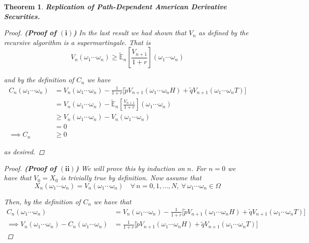 \documentclass[12pt]{article}
\newtheorem{theorem}{Theorem}
\newcommand{\E}{\mathbb E}
\begin{document}
\begin{theorem} {\bf Replication of Path-Dependent American Derivative Securities.}
\begin{proof} {\bf {\em (Proof of $\bm{(i)}$)}} In the last result we had shown that $V_n$ as defined by the recursive algorithm is a supermartingale. That is
\begin{equation*}
	V_n(\omega_1\cdots\omega_n) \geq \tilde{\E}_n \left[ \frac{V_{n + 1}}{1 + r}\right](\omega_1\cdots\omega_n)
\end{equation*}

and by the definition of $C_n$ we have
\begin{align*}
	C_n(\omega_1\cdots\omega_n) &= V_n(\omega_1\cdots\omega_n) - \frac{1}{1 + r}\Big[ \tilde{p}V_{n + 1}(\omega_1\cdots\omega_nH) + \tilde{q}V_{n + 1}(\omega_1\cdots\omega_nT) \Big] \\
	&= V_n(\omega_1\cdots\omega_n) - \tilde{\E}_n \left[ \frac{V_{n + 1}}{1 + r}\right](\omega_1\cdots\omega_n) \\
	&\geq V_n(\omega_1\cdots\omega_n) - V_n(\omega_1\cdots\omega_n) \\
	&= 0 \\
	\implies C_n &\geq 0
\end{align*}

as desired.
\end{proof}

\begin{proof} {\bf {\em (Proof of $\bm{(ii)}$)}} We will prove this by induction on $n$. For $n = 0$ we have that $V_0 = X_0$ is trivially true by definition. Now assume that
\begin{equation*}
	X_n(\omega_1\cdots\omega_n) = V_n(\omega_1\cdots\omega_n) \quad \forall\,n = 0,1,..., N,~\forall\,\omega_1\cdots\omega_n\in\Omega
\end{equation*}

Then, by the definition of $C_n$ we have that
\begin{align*}
	C_n(\omega_1\cdots\omega_n) &= V_n(\omega_1\cdots\omega_n) - \frac{1}{1 + r}\Big[ \tilde{p}V_{n + 1}(\omega_1\cdots\omega_nH) + \tilde{q}V_{n + 1}(\omega_1\cdots\omega_nT) \Big] \\
	\implies V_n(\omega_1\cdots\omega_n) - C_n(\omega_1\cdots\omega_n) &= \frac{1}{1 + r}\Big[ \tilde{p}V_{n + 1}(\omega_1\cdots\omega_nH) + \tilde{q}V_{n + 1}(\omega_1\cdots\omega_nT) \Big]
\end{align*}


\end{proof}
\end{theorem}
\end{document}
